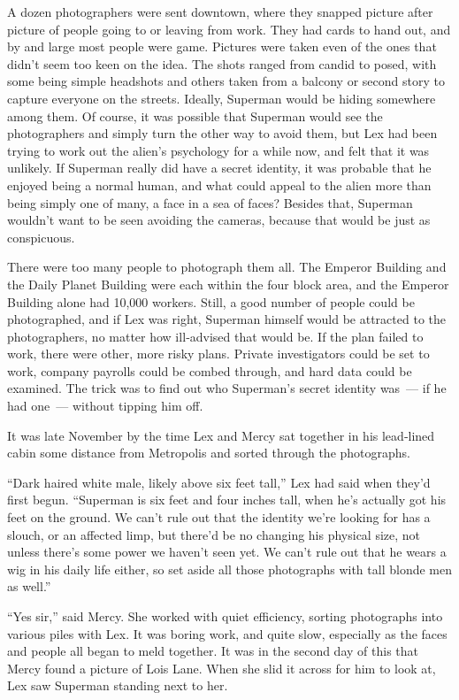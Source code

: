 A dozen photographers were sent downtown, where they snapped picture
after picture of people going to or leaving from work. They had cards to
hand out, and by and large most people were game. Pictures were taken
even of the ones that didn't seem too keen on the idea. The shots ranged
from candid to posed, with some being simple headshots and others taken
from a balcony or second story to capture everyone on the streets.
Ideally, Superman would be hiding somewhere among them. Of course, it
was possible that Superman would see the photographers and simply turn
the other way to avoid them, but Lex had been trying to work out the
alien's psychology for a while now, and felt that it was unlikely. If
Superman really did have a secret identity, it was probable that he
enjoyed being a normal human, and what could appeal to the alien more
than being simply one of many, a face in a sea of faces? Besides that,
Superman wouldn't want to be seen avoiding the cameras, because that
would be just as conspicuous.

There were too many people to photograph them all. The Emperor Building
and the Daily Planet Building were each within the four block area, and
the Emperor Building alone had 10,000 workers. Still, a good number of
people could be photographed, and if Lex was right, Superman himself
would be attracted to the photographers, no matter how ill‐advised that
would be. If the plan failed to work, there were other, more risky
plans. Private investigators could be set to work, company payrolls
could be combed through, and hard data could be examined. The trick was
to find out who Superman's secret identity was~--- if he had one~---
without tipping him off.

It was late November by the time Lex and Mercy sat together in his
lead‐lined cabin some distance from Metropolis and sorted through the
photographs.

``Dark haired white male, likely above six feet tall,'' Lex had said
when they'd first begun. ``Superman is six feet and four inches tall,
when he's actually got his feet on the ground. We can't rule out that
the identity we're looking for has a slouch, or an affected limp, but
there'd be no changing his physical size, not unless there's some power
we haven't seen yet. We can't rule out that he wears a wig in his daily
life either, so set aside all those photographs with tall blonde men as
well.''

``Yes sir,'' said Mercy. She worked with quiet efficiency, sorting
photographs into various piles with Lex. It was boring work, and quite
slow, especially as the faces and people all began to meld together. It
was in the second day of this that Mercy found a picture of Lois Lane.
When she slid it across for him to look at, Lex saw Superman standing
next to her.

